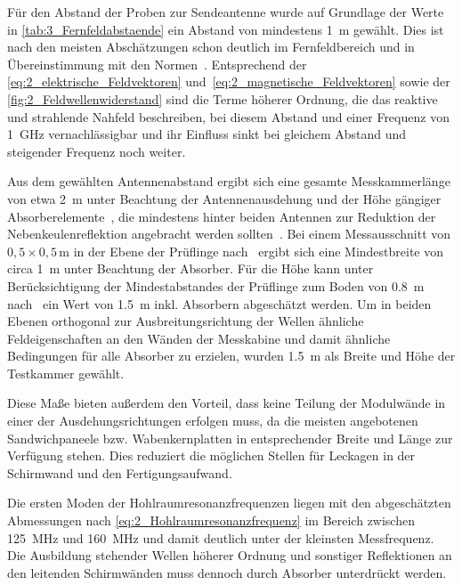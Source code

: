 Für den Abstand der Proben zur Sendeantenne wurde auf Grundlage der Werte in \Tabelle\ref{tab:3_Fernfeldabstaende} ein Abstand von mindestens \SI{1}{\meter} gewählt. Dies ist nach den meisten Abschätzungen schon deutlich im Fernfeldbereich und in Übereinstimmung mit den Normen~\cite{DIN_EN_61000-4-3, VG_95373_15}. Entsprechend der \Gleichungen\eqref{eq:2_elektrische_Feldvektoren} und~\eqref{eq:2_magnetische_Feldvektoren} sowie der \Abb\ref{fig:2_Feldwellenwiderstand} sind die Terme höherer Ordnung, die das reaktive und strahlende Nahfeld beschreiben, bei diesem Abstand und einer Frequenz von \SI{1}{\giga\hertz} vernachlässigbar und ihr Einfluss sinkt bei gleichem Abstand und steigender Frequenz noch weiter. 
\par
\vspace{\linespace}
Aus dem gewählten Antennenabstand ergibt sich eine gesamte Messkammerlänge von etwa \SI{2}{\meter} unter Beachtung der Antennenausdehung und der Höhe gängiger Absorberelemente~\cite{Telemeter_Produktseite, EMV-Support_Produktseite}, die mindestens hinter beiden Antennen zur Reduktion der Nebenkeulenreflektion angebracht werden sollten~\cite{Optimierung_Feldhomogenitaet, EM_Schirmung}. Bei einem Messausschnitt von $0,5 \times 0,5\,\si{\meter}$ in der Ebene der Prüflinge nach~\cite{DIN_EN_61000-4-3} ergibt sich eine Mindestbreite von circa \SI{1}{\meter} unter Beachtung der Absorber. Für die Höhe kann unter Berücksichtigung der Mindestabstandes der Prüflinge zum Boden von \SI{0,8}{\meter} nach~\cite{DIN_EN_61000-4-3, DIN_EN_61000-5-7} ein Wert von \SI{1,5}{\meter} inkl. Absorbern abgeschätzt werden. Um in beiden Ebenen orthogonal zur Ausbreitungsrichtung der Wellen ähnliche Feldeigenschaften an den Wänden der Messkabine und damit ähnliche Bedingungen für alle Absorber zu erzielen, wurden \SI{1,5}{\meter} als Breite und Höhe der Testkammer gewählt. 
\par
\vspace{\linespace}
Diese Maße bieten außerdem den Vorteil, dass keine Teilung der Modulwände in einer der Ausdehungsrichtungen erfolgen muss, da die meisten angebotenen Sandwichpaneele bzw. Wabenkernplatten in entsprechender Breite und Länge zur Verfügung stehen. Dies reduziert die möglichen Stellen für Leckagen in der Schirmwand und den Fertigungsaufwand.
\par
\vspace{\linespace}
Die ersten Moden der Hohlraumresonanzfrequenzen liegen mit den abgeschätzten Abmessungen nach \Gleichung\eqref{eq:2_Hohlraumresonanzfrequenz} im Bereich zwischen \SI{125}{\mega\hertz} und \SI{160}{\mega\hertz} und damit deutlich unter der kleinsten Messfrequenz. Die Ausbildung stehender Wellen höherer Ordnung und sonstiger Reflektionen an den leitenden Schirmwänden muss dennoch durch Absorber unterdrückt werden.
